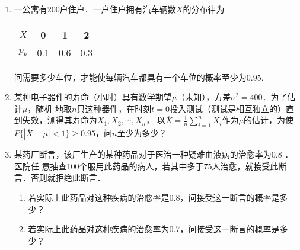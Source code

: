 \documentclass[10pt,a4paper]{article}
\begin{document}
\begin{enumerate}
    \item 一公寓有200户住户．一户住户拥有汽车辆数$X$的分布律为
    \begin{table}[H]\centering
    \begin{tabular}{c|ccc}
    $X$   & 0 & 1   & 2   \\ \hline
    $p_k$ & 0.1  & 0.6 & 0.3
    \end{tabular}
    \end{table}
    \vspace{-0.5cm}
    问需要多少车位，才能使每辆汽车都具有一个车位的概率至少为0.95.
    \clearpage



    \item 某种电子器件的寿命（小时）具有数学期望$\mu$（未知），方差$\sigma^2=400$．为了估计$\mu$，随机
    地取$n$只这种器件，在时刻$t=0$投入测试（测试是相互独立的）直到失效，测得其寿命为$X_1,X_2,\cdots,X_n$，
    以$\displaystyle{\overline{X}=\frac{1}{n}\sum_{i=1}^n X_i}$作为$\mu$的估计，为使
    $P\{|\overline{X}-\mu|<1\}\geq 0.95$，问$n$至少为多少？
    \clearpage




    \item 某药厂断言，该厂生产的某种药品对于医治一种疑难血液病的治愈率为0.8 ．医院任
    意抽查100个服用此药品的病人，若其中多于75人治愈，就接受此断言．否则就拒绝此断言．
    \begin{enumerate}
        \item 若实际上此药品对这种疾病的治愈率是0.8，问接受这一断言的概率是多少？
        \item 若实际上此药品对这种疾病的治愈率为0.7，问接受这一断言的概率是多少？
    \end{enumerate}

    

    


  

\end{enumerate}
\end{document}
